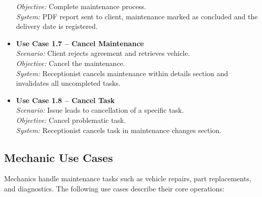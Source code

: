 \begin{itemize}
    \textit{Objective:} Complete maintenance process.\\
    \textit{System:} PDF report sent to client, maintenance marked as concluded and the delivery date is registered.
    \item \textbf{Use Case 1.7 – Cancel Maintenance}\\
    \textit{Scenario:} Client rejects agreement and retrieves vehicle.\\
    \textit{Objective:} Cancel the maintenance.\\
    \textit{System:} Receptionist cancels maintenance within details section and invalidates all uncompleted tasks.
    \item \textbf{Use Case 1.8 – Cancel Task}\\
    \textit{Scenario:} Issue leads to cancellation of a specific task.\\
    \textit{Objective:} Cancel problematic task.\\
    \textit{System:} Receptionist cancels task in maintenance changes section.
\end{itemize}

\subsection{Mechanic Use Cases}
Mechanics handle maintenance tasks such as vehicle repairs, part replacements, and diagnostics. The following use cases describe their core operations:

